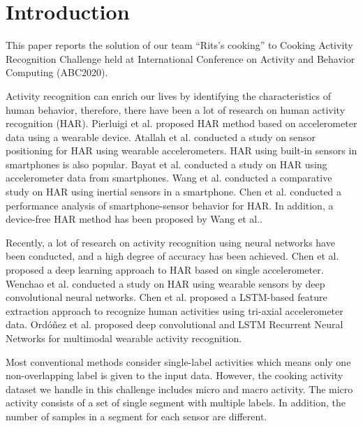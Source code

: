 \documentclass{svmult}
\begin{document}
\section{Introduction}
\label{sec:intro}
This paper reports the solution of our team ``Rits's cooking'' to Cooking Activity Recognition Challenge held at International Conference on Activity and Behavior Computing (ABC2020).\par

Activity recognition can enrich our lives by identifying the characteristics of human behavior, therefore, there have been a lot of research on human activity recognition (HAR). Pierluigi et al.\cite{accelerometer_wareble} proposed HAR method based on accelerometer data using a wearable device. Atallah et al.\cite{accelerometer_positioning} conducted a study on sensor positioning for HAR using wearable accelerometers. HAR using built-in sensors in smartphones is also popular. Bayat et al.\cite{smartphone_accelerometer} conducted a study on HAR using accelerometer data from smartphones. Wang et al.\cite{compare_recognition} conducted a comparative study on HAR using inertial sensors in a smartphone. Chen et al.\cite{performance_analysis} conducted a performance analysis of smartphone-sensor behavior for HAR. In addition, a device-free HAR method has been proposed by Wang et al.\cite{device_free}.\par

Recently, a lot of research on activity recognition using neural networks have been conducted, and a high degree of accuracy has been achieved. Chen et al.\cite{single_accelerometer_cnn} proposed a deep learning approach to HAR based on single accelerometer. Wenchao et al.\cite{dcnn} conducted a study on HAR using wearable sensors by deep convolutional neural networks. Chen et al.\cite{lstm} proposed a LSTM-based feature extraction approach to recognize human activities using tri-axial accelerometer data. Ordóñez et al. proposed deep convolutional and LSTM Recurrent Neural Networks for multimodal wearable activity recognition\cite{deepconv}.\par

Most conventional methods consider single-label activities which means only one non-overlapping label is given to the input data. However, the cooking activity dataset we handle in this challenge includes micro and macro activity. The micro activity consists of a set of single segment with multiple labels. In addition, the number of samples in a segment for each sensor are different.
\end{document}
